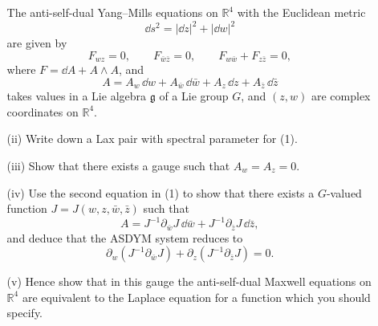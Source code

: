 \begin{enumerate}
\begin{enumerate}
    The anti-self-dual Yang--Mills equations on \(\mathbb R^4\) with the
    Euclidean metric
    \[
      \dd s^2=|\dd z|^2+|\dd w|^2
    \]
    are given by
    \begin{equation}
      F_{wz}=0,\qquad
      F_{\bar w\bar z}=0,\qquad
      F_{w\bar w}+F_{z\bar z}=0,
      \tag{1}
    \end{equation}
    where \(F=\dd A+A\wedge A\), and
    \[
      A=A_w\,\dd w+A_{\bar w}\,\dd\bar w
        +A_z\,\dd z+A_{\bar z}\,\dd\bar z
    \]
    takes values in a Lie algebra \(\mathfrak g\) of a Lie group \(G\),
    and \((z,w)\) are complex coordinates on \(\mathbb R^4\).
    \item[(ii)]
    Write down a Lax pair with spectral parameter for (1).
    \item[(iii)]
    Show that there exists a gauge such that \(A_w=A_z=0\).
    \item[(iv)]
    Use the second equation in (1) to show that there exists a
    \(G\)-valued function
    \(J=J(w,z,\bar w,\bar z)\) such that
    \[
      A=J^{-1}\partial_{\bar w}J\,\dd\bar w
        +J^{-1}\partial_{\bar z}J\,\dd\bar z,
    \]
    and deduce that the ASDYM system reduces to
    \[
      \partial_w(J^{-1}\partial_{\bar w}J)
        +\partial_z(J^{-1}\partial_{\bar z}J)=0.
    \]
    \item[(v)]
    Hence show that in this gauge the anti-self-dual Maxwell equations on
    \(\mathbb R^4\) are equivalent to the Laplace equation for a function
    which you should specify.
  \end{enumerate}


\end{enumerate}
